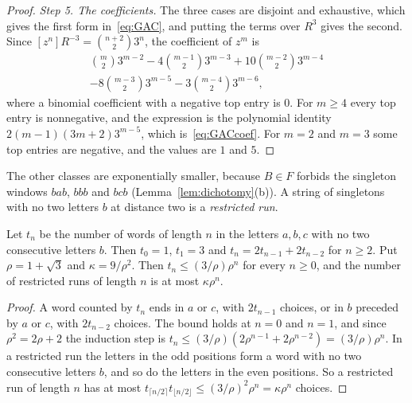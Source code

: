 \begin{proof}
\emph{Step 5. The coefficients.} The three cases are disjoint and exhaustive, which gives the
first form in~\eqref{eq:GAC}, and putting the terms over $R^3$ gives the second. Since
$[z^n]R^{-3}=\binom{n+2}23^n$, the coefficient of $z^m$ is
\begin{multline*}
\binom m23^{m-2}-4\binom{m-1}23^{m-3}+10\binom{m-2}23^{m-4}\\
-8\binom{m-3}23^{m-5}-3\binom{m-4}23^{m-6},
\end{multline*}
where a binomial coefficient with a negative top entry is $0$. For $m\ge4$ every top entry is
nonnegative, and the expression is the polynomial identity $2(m-1)(3m+2)3^{m-5}$, which
is~\eqref{eq:GACcoef}. For $m=2$ and $m=3$ some top entries are negative, and the values are
$1$ and $5$.
\end{proof}

The other classes are exponentially smaller, because $B\in F$ forbids the singleton windows
$bab$, $bbb$ and $bcb$ (Lemma~\ref{lem:dichotomy}(b)). A string of singletons with no two
letters $b$ at distance two is a \emph{restricted run}.

\begin{lemma}[runs]\label{lem:runs}
Let $t_n$ be the number of words of length $n$ in the letters $a,b,c$ with no two consecutive
letters $b$. Then $t_0=1$, $t_1=3$ and $t_n=2t_{n-1}+2t_{n-2}$ for $n\ge2$. Put
$\rho=1+\sqrt3$ and $\kappa=9/\rho^2$. Then $t_n\le(3/\rho)\rho^n$ for every $n\ge0$, and the
number of restricted runs of length $n$ is at most $\kappa\rho^n$.
\end{lemma}

\begin{proof}
A word counted by $t_n$ ends in $a$ or $c$, with $2t_{n-1}$ choices, or in $b$ preceded by $a$
or $c$, with $2t_{n-2}$ choices. The bound holds at $n=0$ and $n=1$, and since
$\rho^2=2\rho+2$ the induction step is $t_n\le(3/\rho)(2\rho^{n-1}+2\rho^{n-2})=(3/\rho)\rho^n$.
In a restricted run the letters in the odd positions form a word with no two consecutive
letters $b$, and so do the letters in the even positions. So a restricted run of length $n$
has at most $t_{\lceil n/2\rceil}t_{\lfloor n/2\rfloor}\le(3/\rho)^2\rho^n=\kappa\rho^n$
choices.
\end{proof}

